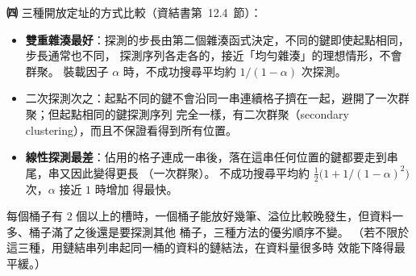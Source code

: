 \begin{pastsoln}
\textbf{㈣} 三種開放定址的方式比較（資結書第~12.4~節）：
\begin{itemize}
\item \textbf{雙重雜湊最好}：探測的步長由第二個雜湊函式決定，不同的鍵即使起點相同，步長通常也不同，
探測序列各走各的，接近「均勻雜湊」的理想情形，不會群聚。 裝載因子 $\alpha$ 時，不成功搜尋平均約
$1/(1 - \alpha)$ 次探測。
\item 二次探測次之：起點不同的鍵不會沿同一串連續格子擠在一起，避開了一次群聚；但起點相同的鍵探測序列
完全一樣，有二次群聚（secondary clustering），而且不保證看得到所有位置。
\item \textbf{線性探測最差}：佔用的格子連成一串後，落在這串任何位置的鍵都要走到串尾，串又因此變得更長
（一次群聚）。 不成功搜尋平均約 $\frac12\bigl(1 + 1/(1 - \alpha)^2\bigr)$ 次，$\alpha$ 接近 $1$ 時增加
得最快。
\end{itemize}
每個桶子有 $2$ 個以上的槽時，一個桶子能放好幾筆、溢位比較晚發生，但資料一多、桶子滿了之後還是要探測其他
桶子，三種方法的優劣順序不變。 （若不限於這三種，用鏈結串列串起同一桶的資料的鏈結法，在資料量很多時
效能下降得最平緩。）
\end{pastsoln}
